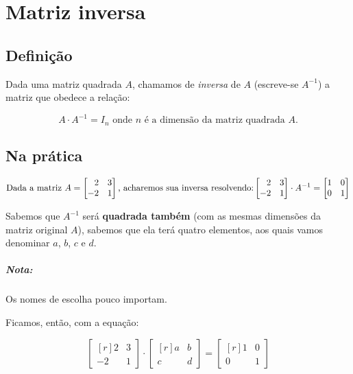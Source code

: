 \chapter{Matriz inversa}

\section{Definição}

Dada uma matriz quadrada $A$, chamamos de \textit{inversa} de $A$ (escreve-se $A^{-1}$) a matriz que obedece a relação:

$$
A\cdot A^{-1}=I_n
\text{ onde $n$ é a dimensão da matriz quadrada $A$.}
$$

\section{Na prática}
\Example
$$
\text{Dada a matriz }A=\begin{bmatrix*}[r]
    2 & 3\\-2 & 1
\end{bmatrix*} \text{, acharemos sua inversa resolvendo:}\\
\begin{bmatrix*}[r]
    2 & 3\\ -2 & 1
\end{bmatrix*} \cdot A^{-1}=\begin{bmatrix*}[r]
    1 & 0\\0 & 1
\end{bmatrix*}
$$

Sabemos que $A^{-1}$ será \textbf{quadrada também} (com as mesmas dimensões da matriz original $A$), sabemos que ela terá quatro elementos, aos quais vamos denominar $a$, $b$, $c$ e $d$.

\paragraph{Nota:} Os nomes de escolha pouco importam.

\medskip

Ficamos, então, com a equação:

$$
\begin{bmatrix*}[r]
    2 & 3\\ -2 & 1
\end{bmatrix*} \cdot \begin{bmatrix*}[r]
    a & b\\c & d
\end{bmatrix*} = \begin{bmatrix*}[r]
    1 & 0 \\ 0 & 1
\end{bmatrix*}
$$

